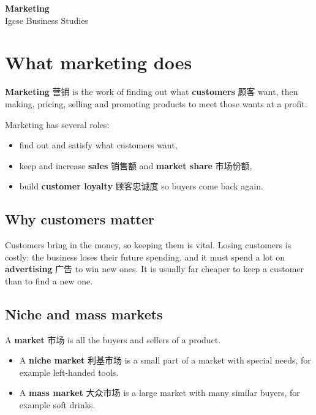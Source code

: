 \documentclass[11pt]{article}
\begin{document}
\begin{center}
  {\LARGE\bfseries Marketing}\\[0.35em]
  {\large Igcse Business Studies}
\end{center}
\vspace{0.6em}

\section*{What marketing does}

\textbf{Marketing} 营销 is the work of finding out what \textbf{customers} 顾客 want, then making, pricing, selling and promoting products to meet those wants at a profit.

Marketing has several roles:

\begin{itemize}
\item find out and satisfy what customers want,

\item keep and increase \textbf{sales} 销售额 and \textbf{market share} 市场份额,

\item build \textbf{customer loyalty} 顾客忠诚度 so buyers come back again.

\end{itemize}

\subsection*{Why customers matter}

Customers bring in the money, so keeping them is vital. Losing customers is costly: the business loses their future spending, and it must spend a lot on \textbf{advertising} 广告 to win new ones. It is usually far cheaper to keep a customer than to find a new one.

\subsection*{Niche and mass markets}

A \textbf{market} 市场 is all the buyers and sellers of a product.

\begin{itemize}
\item A \textbf{niche market} 利基市场 is a small part of a market with special needs, for example left-handed tools.

\item A \textbf{mass market} 大众市场 is a large market with many similar buyers, for example soft drinks.

\end{itemize}
\end{document}
